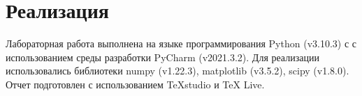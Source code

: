 \section{Реализация}
\begin{flushleft}
	Лабораторная работа выполнена на языке программирования Python (v3.10.3) с с использованием среды разработки PyCharm (v2021.3.2).
	Для реализации использовались библиотеки numpy (v1.22.3), matplotlib (v3.5.2), scipy (v1.8.0). \\
	Отчет подготовлен с использованием TeXstudio и TeX Live.
\end{flushleft}
